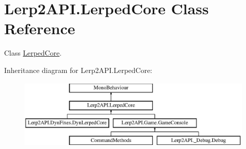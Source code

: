 \hypertarget{class_lerp2_a_p_i_1_1_lerped_core}{}\section{Lerp2\+A\+P\+I.\+Lerped\+Core Class Reference}
\label{class_lerp2_a_p_i_1_1_lerped_core}


Class \hyperlink{class_lerp2_a_p_i_1_1_lerped_core}{Lerped\+Core}.  


Inheritance diagram for Lerp2\+A\+P\+I.\+Lerped\+Core\+:\begin{figure}[H]
\begin{center}
\leavevmode
\includegraphics[height=3.318518cm]{class_lerp2_a_p_i_1_1_lerped_core}
\end{center}
\end{figure}
